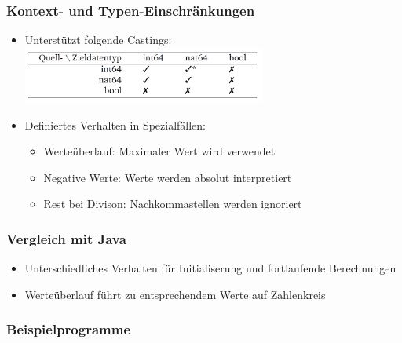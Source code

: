 \documentclass{beamer}
\begin{document}
    \begin{frame}
        \frametitle{Kontext- und Typen-Einschränkungen}
        \begin{itemize}
            \item Unterstützt folgende Castings:
            {\includegraphics[width=8cm]{listing_7.png}}
            \item Definiertes Verhalten in Spezialfällen:
                \begin{itemize}
                    \item Werteüberlauf: Maximaler Wert wird verwendet
                    \item Negative Werte: Werte werden absolut interpretiert
                    \item Rest bei Divison: Nachkommastellen werden ignoriert
                \end{itemize}
        \end{itemize}
        \vspace{30}
    \end{frame}

    \begin{frame}
        \frametitle{Vergleich mit Java}
        \begin{itemize}
            \item Unterschiedliches Verhalten für Initialiserung und fortlaufende Berechnungen
            \item Werteüberlauf führt zu entsprechendem Werte auf Zahlenkreis
        \end{itemize}
        \vspace{30}
    \end{frame}

    \begin{frame}
        \frametitle{Beispielprogramme}

        \vspace{30}
    \end{frame}
\end{document}

